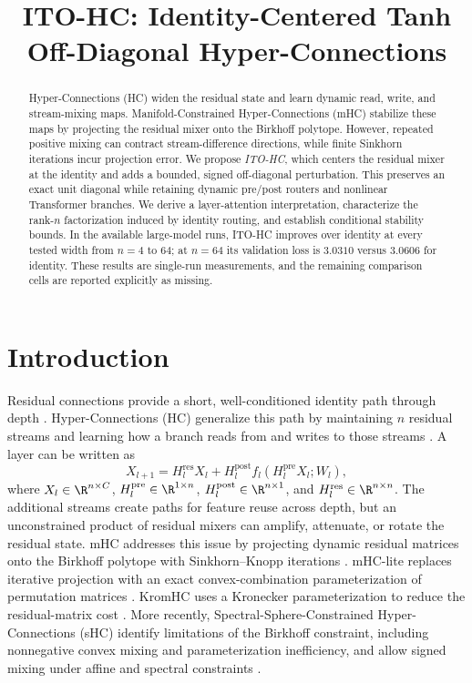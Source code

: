 \documentclass{article}
\title{ITO-HC: Identity-Centered Tanh Off-Diagonal Hyper-Connections}
\author{}
\newcommand{\Hpre}{H^{\mathrm{pre}}}
\newcommand{\Hpost}{H^{\mathrm{post}}}
\newcommand{\Hres}{H^{\mathrm{res}}}
\begin{document}
\maketitle

\begin{abstract}
Hyper-Connections (HC) widen the residual state and learn dynamic read, write, and stream-mixing maps. Manifold-Constrained Hyper-Connections (mHC) stabilize these maps by projecting the residual mixer onto the Birkhoff polytope. However, repeated positive mixing can contract stream-difference directions, while finite Sinkhorn iterations incur projection error. We propose \emph{ITO-HC}, which centers the residual mixer at the identity and adds a bounded, signed off-diagonal perturbation. This preserves an exact unit diagonal while retaining dynamic pre/post routers and nonlinear Transformer branches. We derive a layer-attention interpretation, characterize the rank-$n$ factorization induced by identity routing, and establish conditional stability bounds. In the available large-model runs, ITO-HC improves over identity at every tested width from $n=4$ to $64$; at $n=64$ its validation loss is $3.0310$ versus $3.0606$ for identity. These results are single-run measurements, and the remaining comparison cells are reported explicitly as missing.
\end{abstract}

\section{Introduction}

Residual connections provide a short, well-conditioned identity path through depth \citep{he2016deep}. Hyper-Connections (HC) generalize this path by maintaining $n$ residual streams and learning how a branch reads from and writes to those streams \citep{zhu2024hyper}. A layer can be written as
\begin{equation}
 X_{l+1}=\Hres_l X_l+\Hpost_l f_l(\Hpre_l X_l;W_l),
 \label{eq:hc}
\end{equation}
where $X_l\in\R^{n\times C}$, $\Hpre_l\in\R^{1\times n}$, $\Hpost_l\in\R^{n\times 1}$, and $\Hres_l\in\R^{n\times n}$. The additional streams create paths for feature reuse across depth, but an unconstrained product of residual mixers can amplify, attenuate, or rotate the residual state. mHC addresses this issue by projecting dynamic residual matrices onto the Birkhoff polytope with Sinkhorn--Knopp iterations \citep{xie2026mhc}. mHC-lite replaces iterative projection with an exact convex-combination parameterization of permutation matrices \citep{yang2026mhclite}. KromHC uses a Kronecker parameterization to reduce the residual-matrix cost \citep{zhou2026kromhc}. More recently, Spectral-Sphere-Constrained Hyper-Connections (sHC) identify limitations of the Birkhoff constraint, including nonnegative convex mixing and parameterization inefficiency, and allow signed mixing under affine and spectral constraints \citep{liu2026shc}.
\end{document}
